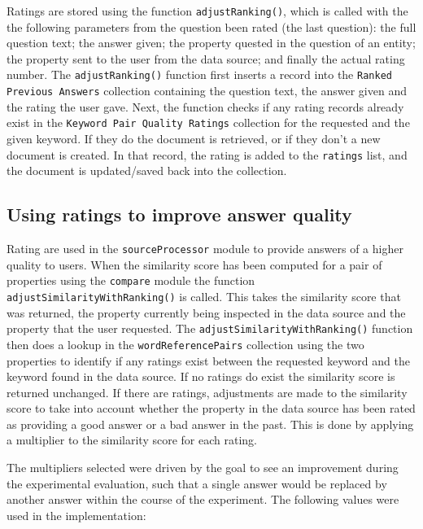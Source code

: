 \documentclass[authoryearcitations]{UoYCSproject}
\begin{document}
Ratings are stored using the function \texttt{adjustRanking()}, which is called with the the following parameters from the question been rated (the last question): the full question text; the answer given; the property quested in the question of an entity; the property sent to the user from the data source; and finally the actual rating number. The \texttt{adjustRanking()} function first inserts a record into the \texttt{Ranked Previous Answers} collection containing the question text, the answer given and the rating the user gave. Next, the function checks if any rating records already exist in the \texttt{Keyword Pair Quality Ratings} collection for the requested and the given keyword. If they do the document is retrieved, or if they don't a new document is created. In that record, the rating is added to the \texttt{ratings} list, and the document is updated/saved back into the collection.

\subsection{Using ratings to improve answer quality}
\label{subsec:usingRatings}

Rating are used in the \texttt{sourceProcessor} module to provide answers of a higher quality to users. When the similarity score has been computed for a pair of properties using the \texttt{compare} module the function \texttt{adjustSimilarityWithRanking()} is called. This takes the similarity score that was returned, the property currently being inspected in the data source and the property that the user requested. The \texttt{adjustSimilarityWithRanking()} function then does a lookup in the \texttt{wordReferencePairs} collection using the two properties to identify if any ratings exist between the requested keyword and the keyword found in the data source. If no ratings do exist the similarity score is returned unchanged. If there are ratings, adjustments are made to the similarity score to take into account whether the property in the data source has been rated as providing a good answer or a bad answer in the past. This is done by applying a multiplier to the similarity score for each rating. 

The multipliers selected were driven by the goal to see an improvement during the experimental evaluation, such that a single answer would be replaced by another answer within the course of the experiment. The following values were used in the implementation:
\end{document}
